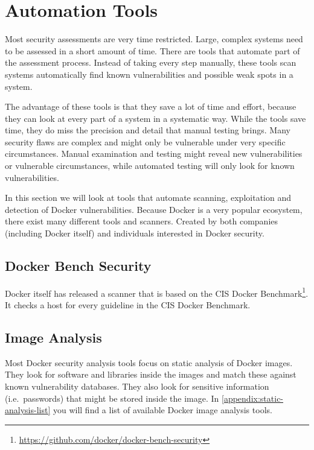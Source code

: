 \section{Automation Tools}
Most security assessments are very time restricted. Large, complex systems need to be assessed in a short amount of time. There are tools that automate part of the assessment process. Instead of taking every step manually, these tools scan systems automatically find known vulnerabilities and possible weak spots in a system.

The advantage of these tools is that they save a lot of time and effort, because they can look at every part of a system in a systematic way. While the tools save time, they do miss the precision and detail that manual testing brings. Many security flaws are complex and might only be vulnerable under very specific circumstances. Manual examination and testing might reveal new vulnerabilities or vulnerable circumstances, while automated testing will only look for known vulnerabilities.

\hfill

In this section we will look at tools that automate scanning, exploitation and detection of Docker vulnerabilities. Because Docker is a very popular ecosystem, there exist many different tools and scanners. Created by both companies (including Docker itself) and individuals interested in Docker security.

\subsection{Docker Bench Security}
Docker itself has released a scanner that is based on the CIS Docker Benchmark\footnote{\url{https://github.com/docker/docker-bench-security}}. It checks a host for every guideline in the CIS Docker Benchmark.

\subsection{Image Analysis}\label{subsection:image-analysis-tools}
Most Docker security analysis tools focus on static analysis of Docker images. They look for software and libraries inside the images and match these against known vulnerability databases. They also look for sensitive information (i.e.\ passwords) that might be stored inside the image. In \autoref{appendix:static-analysis-list} you will find a list of available Docker image analysis tools.

